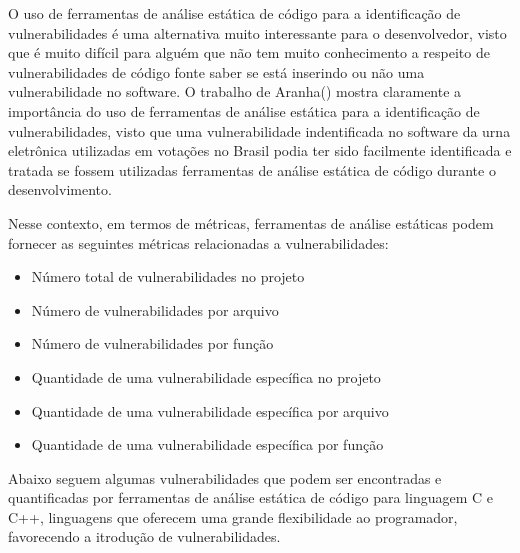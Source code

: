 O uso de ferramentas de análise estática de código para a identificação de vulnerabilidades é uma alternativa muito interessante para o desenvolvedor, visto que é muito difícil para alguém que não tem muito conhecimento a respeito de vulnerabilidades de código fonte saber se está inserindo ou não uma vulnerabilidade no software. O trabalho de Aranha(\citeyear{aranha2012}) mostra claramente a importância do uso de ferramentas de análise estática para a identificação de vulnerabilidades, visto que uma vulnerabilidade indentificada no software da urna eletrônica utilizadas em votações no Brasil podia ter sido facilmente identificada e tratada se fossem utilizadas ferramentas de análise estática de código durante o desenvolvimento.

%

Nesse contexto, em termos de métricas, ferramentas de análise estáticas podem fornecer as seguintes métricas relacionadas a vulnerabilidades:

\begin{itemize}
\item Número total de vulnerabilidades no projeto
\item Número de vulnerabilidades por arquivo
\item Número de vulnerabilidades por função
\item Quantidade de uma vulnerabilidade específica no projeto
\item Quantidade de uma vulnerabilidade específica por arquivo
\item Quantidade de uma vulnerabilidade específica por função
\end{itemize}

%
Abaixo seguem algumas vulnerabilidades que podem ser encontradas e quantificadas por ferramentas de análise estática de código para linguagem C e C++, linguagens que oferecem uma grande flexibilidade ao programador, favorecendo a itrodução de vulnerabilidades.


